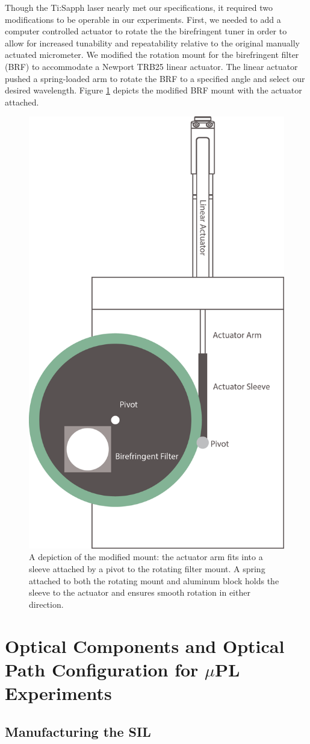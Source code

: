 \indent Though the Ti:Sapph laser nearly met our specifications, it required two modifications to be operable in our experiments. First, we needed to add a computer controlled actuator to rotate the the birefringent tuner in order to allow for increased tunability and repeatability relative to the original manually actuated micrometer. We modified the rotation mount for the birefringent filter (BRF) to accommodate a Newport TRB25 linear actuator. The linear actuator pushed a spring-loaded arm to rotate the BRF to a specified angle and select our desired wavelength. Figure \ref{brfmount} depicts the modified BRF mount with the actuator attached.
\begin{figure}[h!]
\centering
\includegraphics[width = .35\textwidth]{Actuator.png}
\caption{ \doublespacing A depiction of the modified mount: the actuator arm fits into a sleeve attached by a pivot to the rotating filter mount. A spring attached to both the rotating mount and aluminum block holds the sleeve to the actuator and ensures smooth rotation in either direction.}
\label{brfmount}
\end{figure}

\section{Optical Components and Optical Path Configuration for $\mu$PL Experiments}

\subsection{Manufacturing the SIL}

